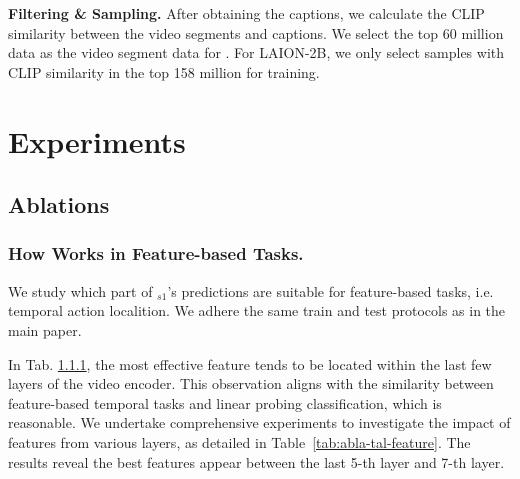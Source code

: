 \noindent\textbf{Filtering \& Sampling.} After obtaining the captions, we calculate the CLIP similarity between the video segments and captions. We select the top 60 million data as the video segment data for \dataname{}. For LAION-2B, we only select samples with CLIP similarity in the top 158 million for training.

\section{Experiments}

\subsection{Ablations}

\subsubsection{How {\modelname} Works in Feature-based Tasks.} \label{supp:tal} We study which part of {\modelname}$_{s1}$'s predictions are suitable for feature-based tasks, i.e. temporal action localition. We adhere the same train and test protocols as in the main paper.

In Tab. \ref{supp:tal}, the most effective feature tends to be located within the last few layers of the video encoder. This observation aligns with the similarity between feature-based temporal tasks and linear probing classification, which is reasonable. We undertake comprehensive experiments to investigate the impact of features from various layers, as detailed in Table~\ref{tab:abla-tal-feature}. The results reveal the best features appear between the last 5-th layer and 7-th layer.

